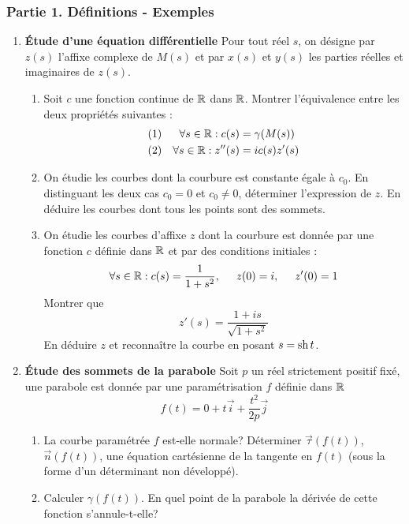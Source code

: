 \subsubsection*{Partie 1. Définitions - Exemples}
\begin{enumerate}
 \item \textbf{\'Etude d'une équation différentielle}\newline
Pour tout réel $s$, on désigne par $z(s)$ l'affixe complexe de $M(s)$ et par $x(s)$ et $y(s)$ les parties réelles et imaginaires de $z(s)$.
\begin{enumerate}
 \item Soit $c$ une fonction continue de $\mathbb{R}$ dans $\mathbb{R}$. Montrer l'équivalence entre les deux propriétés suivantes :
\begin{align*}
 (1) & & \forall s\in\mathbb{R} : c(s)& =\gamma(M(s))\\
 (2) & & \forall s\in\mathbb{R} : z''(s)& =ic(s)z'(s)
\end{align*}

\item On étudie les courbes dont la courbure est constante égale à $c_0$.\newline
En distinguant les deux cas $c_0=0$ et $c_0\neq0$, déterminer l'expression de $z$. En déduire les courbes dont tous les points sont des sommets.
\item On étudie les courbes d'affixe $z$ dont la courbure est donnée par une fonction $c$ définie dans $\mathbb{R}$ et par des conditions initiales :
\begin{displaymath}
 \forall s\in \mathbb{R} :c(s)=\dfrac{1}{1+s^2}, \hspace{0.5cm} z(0)=i, \hspace{0.5cm} z'(0)=1
\end{displaymath}
Montrer que
\begin{displaymath}
 z'(s)=\dfrac{1+is}{\sqrt{1+s^2}}
\end{displaymath}
En déduire $z$ et reconnaître la courbe en posant $s=\operatorname{sh} t$.
\end{enumerate}
\item \textbf{\'Etude des sommets de la parabole}\newline
Soit $p$ un réel strictement positif fixé, une parabole est donnée par une paramétrisation $f$ définie dans $\mathbb{R}$
\begin{displaymath}
 f(t)=0+t\overrightarrow i +\dfrac{t^2}{2p}\overrightarrow j
\end{displaymath}
\begin{enumerate}
 \item La courbe paramétrée $f$ est-elle normale? Déterminer $\overrightarrow \tau (f(t))$, $\overrightarrow n (f(t))$, une équation cartésienne de la tangente en $f(t)$ (sous la forme d'un déterminant non développé).
\item Calculer $\gamma(f(t))$. En quel point de la parabole la dérivée de cette fonction s'annule-t-elle?
\end{enumerate}


\end{enumerate}
